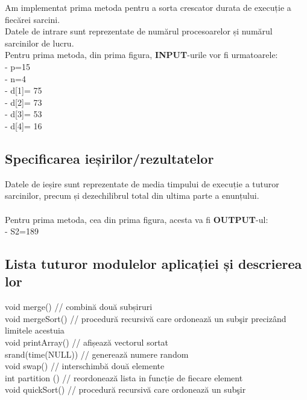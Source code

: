 \documentclass{article}
\begin{document}
Am implementat prima metoda pentru a sorta crescator durata de execuție a fiecărei sarcini. \\
Datele de intrare sunt reprezentate de numărul procesoarelor și numărul sarcinilor de lucru. \\
Pentru prima metoda, din prima figura, \textbf{INPUT}-urile vor fi urmatoarele: \\
- \hspace{0.4cm}p=15 \\
- \hspace{0.4cm}n=4 \\
- \hspace{0.4cm}d[1]= 75 \\
- \hspace{0.4cm}d[2]= 73 \\
- \hspace{0.4cm}d[3]= 53 \\
- \hspace{0.4cm}d[4]= 16 \\



\subsection{Specificarea ieșirilor/rezultatelor}

Datele de ieșire sunt reprezentate de media timpului de execuție a tuturor sarcinilor, precum și dezechilibrul total din ultima parte a enunțului. \\ 
\\
 Pentru prima metoda, cea din prima figura, acesta va fi \textbf{OUTPUT}-ul: \\
 - \hspace{0.4cm}S2=189 \\


\subsection{Lista tuturor modulelor aplicației și descrierea lor}

void merge()  \hspace{1cm}// combină două subșiruri\\
void mergeSort() \hspace{1cm} // procedură recursivă care ordonează un subşir precizând limitele acestuia \\
void printArray()  \hspace{1cm}// afișează vectorul sortat \\
srand(time(NULL)) \hspace{1cm}// generează numere random
\\
void swap() \hspace{1cm} // interschimbă două elemente     \\
int partition ()   \hspace{1cm} // reordonează lista in funcție de fiecare element             \\ 
void quickSort()  \hspace{0.5cm} //  procedură recursivă care ordonează un subşir     \\
\end{document}
